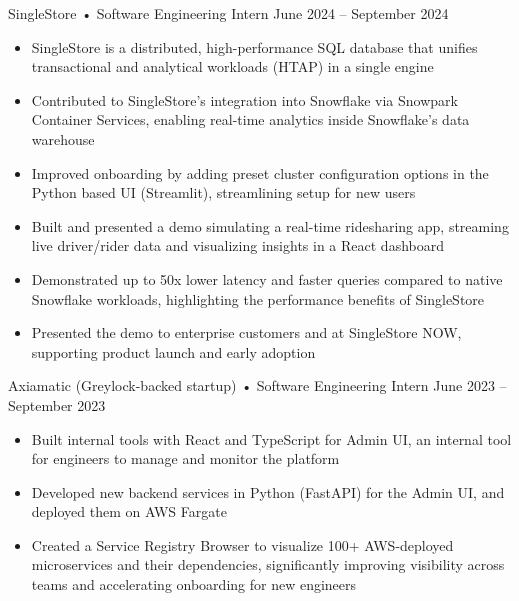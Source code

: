 \documentclass[9pt]{developercv} %
\begin{document}
\begin{entrylist}
    \entry
        {}
        {SingleStore • Software Engineering Intern}
        {June 2024 – September 2024}
        {\vspace{-8pt}
        \begin{itemize}[noitemsep,topsep=0pt,parsep=0pt,partopsep=0pt, leftmargin=10pt]
            \item SingleStore is a distributed, high-performance SQL database that unifies transactional and analytical workloads (HTAP) in a single engine
            \item Contributed to SingleStore's integration into Snowflake via Snowpark Container Services, enabling real-time analytics inside Snowflake's data warehouse
            \item Improved onboarding by adding preset cluster configuration options in the Python based UI (Streamlit), streamlining setup for new users
            \item Built and presented a demo simulating a real-time ridesharing app, streaming live driver/rider data and visualizing insights in a React dashboard
            \item Demonstrated up to 50x lower latency and faster queries compared to native Snowflake workloads, highlighting the performance benefits of SingleStore
            \item Presented the demo to enterprise customers and at SingleStore NOW, supporting product launch and early adoption
        \end{itemize}}
    \entry
        {}
        {Axiamatic (Greylock-backed startup) • Software Engineering Intern}
        {June 2023 – September 2023}
        {\vspace{-8pt}
        \begin{itemize}[noitemsep,topsep=0pt,parsep=0pt,partopsep=0pt, leftmargin=10pt]
            \item Built internal tools with React and TypeScript for Admin UI, an internal tool for engineers to manage and monitor the platform
            \item Developed new backend services in Python (FastAPI) for the Admin UI, and deployed them on AWS Fargate
            \item Created a Service Registry Browser to visualize 100+ AWS-deployed microservices and their dependencies, significantly improving visibility across teams and accelerating onboarding for new engineers

\end{itemize}}
\end{entrylist}
\end{document}
